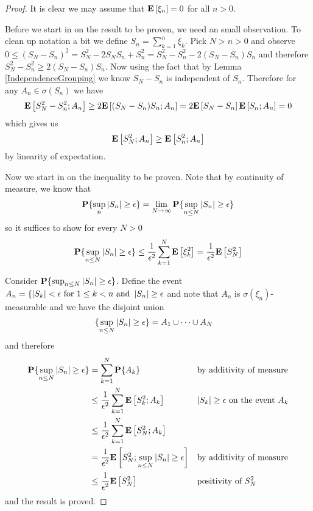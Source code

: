 \begin{proof}
It is clear we may assume that $\textbf{E}\left[\xi_n\right] = 0$ for all $n >
0$.  

Before we start in on the result to be proven, we need an small
observation.  To clean up notation a bit we define $S_n = \sum_{k=1}^n    \xi_k$.
Pick $N > n > 0$ and observe $0 \leq (S_N-S_n)^2 =  S_N^2 - 2 S_N S_n + S_n^2
= S_N^2 - S_n^2 - 2(S_N - S_n)S_n$ and therefore 
$S_N^2 - S_n^2 \geq 2(S_N - S_n)S_n$.  Now using the fact that by Lemma
\ref{IndependenceGrouping} we know $S_N - S_n$ is independent of
$S_n$.  Therefore for any $A_n \in \sigma(S_n)$ we have
\begin{align*}
\textbf{E}\left[S_N^2 - S_n^2 ; A_n\right] \geq 2\textbf{E}\left[(S_N - S_n)S_n;
  A_n\right] = 2\textbf{E}\left[S_N - S_n\right]\textbf{E}\left[S_n;  A_n\right] = 0
\end{align*}
which gives us 
\begin{align*}
\textbf{E}\left[S_N^2; A_n\right] \geq \textbf{E}\left[S_n^2;  A_n\right] 
\end{align*}
by linearity of expectation.  

Now we start in on the inequality to be proven.  Note that by continuity of measure, we know that 
\begin{align*}
\textbf{P}\{\sup_n \left \vert S_n \right \vert  \geq \epsilon\}  =
\lim_{N \to \infty} \textbf{P}\{\sup_{n \leq N} \left \vert S_n \right \vert  \geq \epsilon\}
\end{align*}
so it suffices to show for every $N > 0$ 
\begin{align*}
\textbf{P}\{\sup_{n \leq N} \left \vert S_n \right \vert \geq \epsilon\} \leq
\frac{1}{\epsilon^2} \sum_{k=1}^N \textbf{E}\left[\xi_k^2\right] =
\frac{1}{\epsilon^2} \textbf{E}\left[S_N^2\right]
\end{align*}

Consider $\textbf{P}\{\sup_{n \leq N} \left \vert S_n \right \vert \geq
  \epsilon\}$.  Define the event $A_n = \lbrace \left \vert S_k \right \vert < \epsilon
\text{ for $1\leq k < n$ and } \left \vert S_n \right \vert \geq
  \epsilon$ and note that $A_n$ is $\sigma(\xi_n)$-measurable and we have the disjoint union 
\begin{align*}
\lbrace \sup_{n \leq N} \left \vert S_n \right \vert \geq
  \epsilon \rbrace &= A_1 \cup \cdots \cup A_N
\end{align*}
and therefore 
\begin{align*}
\textbf{P}\{ \sup_{n \leq N} \left \vert S_n \right \vert \geq
  \epsilon \} &= \sum_{k=1}^N \textbf{P}\{A_k\} & & \text{by additivity
  of measure}\\
&\leq
\frac{1}{\epsilon^2}\sum_{k=1}^N \textbf{E}\left[S_k^2 ; A_k\right] & & \text{$\left \vert S_k \right \vert
\geq \epsilon$ on the event $A_k$}\\
&\leq \frac{1}{\epsilon^2}\sum_{k=1}^N \textbf{E}\left[S_N^2 ; A_k\right] \\
&= \frac{1}{\epsilon^2}\textbf{E}\left[S_N^2 ; { \sup_{n \leq N} \left \vert S_n \right \vert \geq
  \epsilon }\right] & & \text{by additivity
  of measure}\\
&\leq \frac{1}{\epsilon^2}\textbf{E}\left[S_N^2 \right] & & \text{positivity of $S_N^2$}
\end{align*}
and the result is proved.  
\end{proof}

